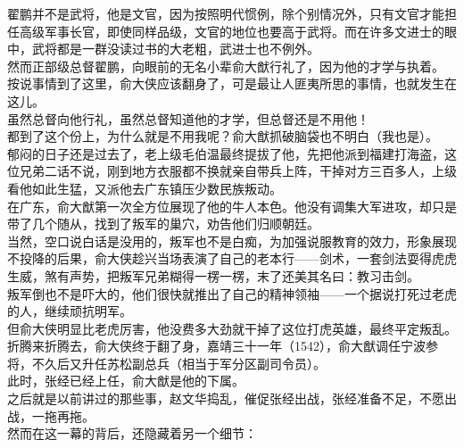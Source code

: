 \begin{multicols}{\theparacolNo}
翟鹏并不是武将，他是文官，因为按照明代惯例，除个别情况外，只有文官才能担任高级军事长官，即使同样品级，文官的地位也要高于武将。而在许多文进士的眼中，武将都是一群没读过书的大老粗，武进士也不例外。\\

然而正部级总督翟鹏，向眼前的无名小辈俞大猷行礼了，因为他的才学与执着。\\

按说事情到了这里，俞大侠应该翻身了，可是最让人匪夷所思的事情，也就发生在这儿。\\

虽然总督向他行礼，虽然总督知道他的才学，但总督还是不用他！\\

都到了这个份上，为什么就是不用我呢？俞大猷抓破脑袋也不明白（我也是）。\\

郁闷的日子还是过去了，老上级毛伯温最终提拔了他，先把他派到福建打海盗，这位兄弟二话不说，刚到地方衣服都不换就亲自带兵上阵，干掉对方三百多人，上级看他如此生猛，又派他去广东镇压少数民族叛动。\\

在广东，俞大猷第一次全方位展现了他的牛人本色。他没有调集大军进攻，却只是带了几个随从，找到了叛军的巢穴，劝告他们归顺朝廷。\\

当然，空口说白话是没用的，叛军也不是白痴，为加强说服教育的效力，形象展现不投降的后果，俞大侠趁兴当场表演了自己的老本行——剑术，一套剑法耍得虎虎生威，煞有声势，把叛军兄弟糊得一楞一楞，末了还美其名曰：教习击剑。\\

叛军倒也不是吓大的，他们很快就推出了自己的精神领袖——一个据说打死过老虎的人，继续顽抗明军。\\

但俞大侠明显比老虎厉害，他没费多大劲就干掉了这位打虎英雄，最终平定叛乱。\\

折腾来折腾去，俞大侠终于翻了身，嘉靖三十一年（1542），俞大猷调任宁波参将，不久后又升任苏松副总兵（相当于军分区副司令员）。\\

此时，张经已经上任，俞大猷是他的下属。\\

之后就是以前讲过的那些事，赵文华捣乱，催促张经出战，张经准备不足，不愿出战，一拖再拖。\\

然而在这一幕的背后，还隐藏着另一个细节：\\


\end{multicols}
